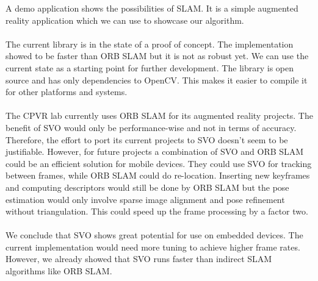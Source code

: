 \documentclass[11pt,a4paper,titlepage,oneside]{report}
\begin{document}
A demo application shows the possibilities of SLAM. It is a simple augmented reality application which we can use to showcase our algorithm.\\\\
The current library is in the state of a proof of concept. The implementation showed to be faster than ORB SLAM but it is not as robust yet. We can use the current state as a starting point for further development. The library is open source and has only dependencies to OpenCV. This makes it easier to compile it for other platforms and systems.\\\\
The CPVR lab currently uses ORB SLAM for its augmented reality projects. The benefit of SVO would only be performance-wise and not in terms of accuracy. Therefore, the effort to port its current projects to SVO doesn't seem to be justifiable. However, for future projects a combination of SVO and ORB SLAM could be an efficient solution for mobile devices. They could use SVO for tracking between frames, while ORB SLAM could do re-location. Inserting new keyframes and computing descriptors would still be done by ORB SLAM but the pose estimation would only involve sparse image alignment and pose refinement without triangulation. This could speed up the frame processing by a factor two.\\\\
We conclude that SVO shows great potential for use on embedded devices. The current implementation would need more tuning to achieve higher frame rates. However, we already showed that SVO runs faster than indirect SLAM algorithms like ORB SLAM.

\printbibliography
\end{document}
